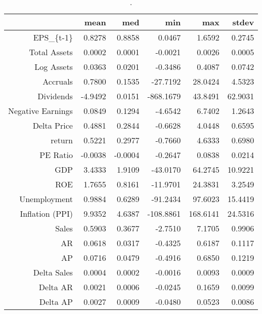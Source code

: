 \begin{table}[ht]
\centering
\begin{tabular}{rrrrrr}
  \hline
 & mean & med & min & max & stdev \\ 
  \hline
EPS\_\{t-1\} & 0.8278 & 0.8858 & 0.0467 & 1.6592 & 0.2745 \\ 
  Total Assets & 0.0002 & 0.0001 & -0.0021 & 0.0026 & 0.0005 \\ 
  Log Assets & 0.0363 & 0.0201 & -0.3486 & 0.4087 & 0.0742 \\ 
  Accruals & 0.7800 & 0.1535 & -27.7192 & 28.0424 & 4.5323 \\ 
  Dividends & -4.9492 & 0.0151 & -868.1679 & 43.8491 & 62.9031 \\ 
  Negative Earnings & 0.0849 & 0.1294 & -4.6542 & 6.7402 & 1.2643 \\ 
  Delta Price & 0.4881 & 0.2844 & -0.6628 & 4.0448 & 0.6595 \\ 
  return & 0.5221 & 0.2977 & -0.7660 & 4.6333 & 0.6980 \\ 
  PE Ratio & -0.0038 & -0.0004 & -0.2647 & 0.0838 & 0.0214 \\ 
  GDP & 3.4333 & 1.9109 & -43.0170 & 64.2745 & 10.9221 \\ 
  ROE & 1.7655 & 0.8161 & -11.9701 & 24.3831 & 3.2549 \\ 
  Unemployment & 0.9884 & 0.6289 & -91.2434 & 97.6023 & 15.4419 \\ 
  Inflation (PPI) & 9.9352 & 4.6387 & -108.8861 & 168.6141 & 24.5316 \\ 
  Sales & 0.5903 & 0.3677 & -2.7510 & 7.1705 & 0.9906 \\ 
  AR & 0.0618 & 0.0317 & -0.4325 & 0.6187 & 0.1117 \\ 
  AP & 0.0716 & 0.0479 & -0.4916 & 0.6850 & 0.1219 \\ 
  Delta Sales & 0.0004 & 0.0002 & -0.0016 & 0.0093 & 0.0009 \\ 
  Delta AR & 0.0021 & 0.0006 & -0.0245 & 0.1659 & 0.0099 \\ 
  Delta AP & 0.0027 & 0.0009 & -0.0480 & 0.0523 & 0.0086 \\ 
   \hline
\end{tabular}
\caption{.} 
\label{univariate-stats-eps}
\end{table}
